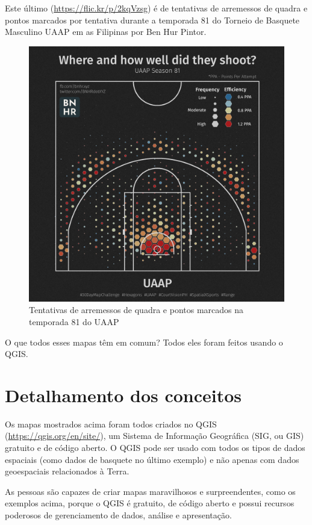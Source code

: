 \documentclass[
]{book}
\begin{document}
Este último (\href{https://flic.kr/p/v2kqVzsg}{https://flic.kr/p/2kqVzsg}) é de tentativas de arremessos de quadra e pontos marcados por tentativa durante a temporada 81 do Torneio de Basquete Masculino UAAP em as Filipinas por Ben Hur Pintor.

\begin{figure}
\centering
\includegraphics{media/modulo1/sample-4.jpg}
\caption{Tentativas de arremessos de quadra e pontos marcados na temporada 81 do UAAP}
\end{figure}

O que todos esses mapas têm em comum? Todos eles foram feitos usando o QGIS.

\hypertarget{detalhamento-dos-conceitos}{%
\section{Detalhamento dos conceitos}\label{detalhamento-dos-conceitos}}

Os mapas mostrados acima foram todos criados no QGIS (\url{https://qgis.org/en/site/}), um Sistema de Informação Geográfica (SIG, ou GIS) gratuito e de código aberto. O QGIS pode ser usado com todos os tipos de dados espaciais (como dados de basquete no último exemplo) e não apenas com dados geoespaciais relacionados à Terra.

As pessoas são capazes de criar mapas maravilhosos e surpreendentes, como os exemplos acima, porque o QGIS é gratuito, de código aberto e possui recursos poderosos de gerenciamento de dados, análise e apresentação.
\end{document}
